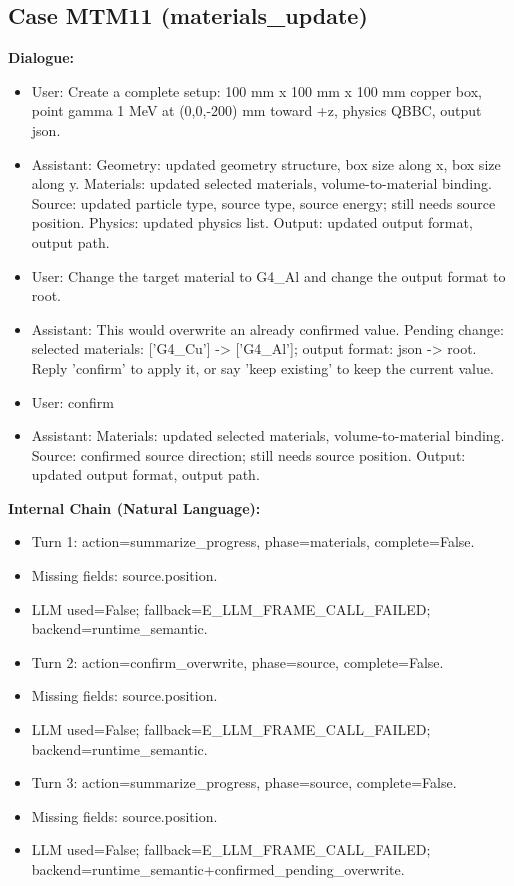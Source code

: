 \documentclass[11pt]{ctexart}
\begin{document}
\subsection{Case MTM11 (materials\_update)}
\textbf{Dialogue:}
\begin{itemize}
\item User: Create a complete setup: 100 mm x 100 mm x 100 mm copper box, point gamma 1 MeV at (0,0,-200) mm toward +z, physics QBBC, output json.
\item Assistant: Geometry: updated geometry structure, box size along x, box size along y. Materials: updated selected materials, volume-to-material binding. Source: updated particle type, source type, source energy; still needs source position. Physics: updated physics list. Output: updated output format, output path.
\item User: Change the target material to G4\_Al and change the output format to root.
\item Assistant: This would overwrite an already confirmed value. Pending change: selected materials: ['G4\_Cu'] -> ['G4\_Al']; output format: json -> root. Reply 'confirm' to apply it, or say 'keep existing' to keep the current value.
\item User: confirm
\item Assistant: Materials: updated selected materials, volume-to-material binding. Source: confirmed source direction; still needs source position. Output: updated output format, output path.
\end{itemize}
\textbf{Internal Chain (Natural Language):}
\begin{itemize}
\item Turn 1: action=summarize\_progress, phase=materials, complete=False.
\item Missing fields: source.position.
\item LLM used=False; fallback=E\_LLM\_FRAME\_CALL\_FAILED; backend=runtime\_semantic.
\item Turn 2: action=confirm\_overwrite, phase=source, complete=False.
\item Missing fields: source.position.
\item LLM used=False; fallback=E\_LLM\_FRAME\_CALL\_FAILED; backend=runtime\_semantic.
\item Turn 3: action=summarize\_progress, phase=source, complete=False.
\item Missing fields: source.position.
\item LLM used=False; fallback=E\_LLM\_FRAME\_CALL\_FAILED; backend=runtime\_semantic+confirmed\_pending\_overwrite.
\end{itemize}
\end{document}
